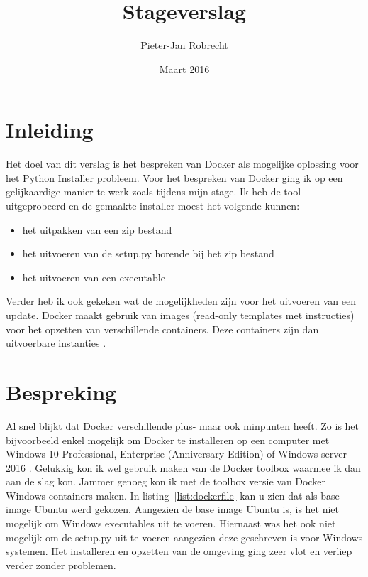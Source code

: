 \documentclass{article}
\title{Stageverslag}
\author{\mbox{Pieter-Jan} Robrecht}
\date{Maart 2016}
\begin{document}


\clearpage
\setcounter{page}{1}

\tableofcontents
\lstlistoflistings
\clearpage

\section{Inleiding}
Het doel van dit verslag is het bespreken van Docker als mogelijke oplossing voor het Python Installer probleem.
Voor het bespreken van Docker ging ik op een gelijkaardige manier te werk zoals tijdens mijn stage.
Ik heb de tool uitgeprobeerd en de gemaakte installer moest het volgende kunnen:
\begin{itemize}
\item het uitpakken van een zip bestand
\item het uitvoeren van de setup.py horende bij het zip bestand
\item het uitvoeren van een executable
\end{itemize}
Verder heb ik ook gekeken wat de mogelijkheden zijn voor het uitvoeren van een update.
Docker maakt gebruik van images (read-only templates met instructies) voor het opzetten van verschillende containers.
Deze containers zijn dan uitvoerbare instanties \citep{docker}.

\section{Bespreking}
Al snel blijkt dat Docker verschillende plus- maar ook minpunten heeft.
Zo is het bijvoorbeeld enkel mogelijk om Docker te installeren op een computer met Windows 10 Professional, Enterprise (Anniversary Edition) of Windows server 2016 \citep{microsoft}.
Gelukkig kon ik wel gebruik maken van de Docker toolbox waarmee ik dan aan de slag kon.
Jammer genoeg kon ik met de toolbox versie van Docker Windows containers maken.
In listing~\vref{list:dockerfile} kan u zien dat als base image Ubuntu werd gekozen.
Aangezien de base image Ubuntu is, is het niet mogelijk om Windows executables uit te voeren.
Hiernaast was het ook niet mogelijk om de setup.py uit te voeren aangezien deze geschreven is voor Windows systemen.
Het installeren en opzetten van de omgeving ging zeer vlot en verliep verder zonder problemen.
\end{document}
